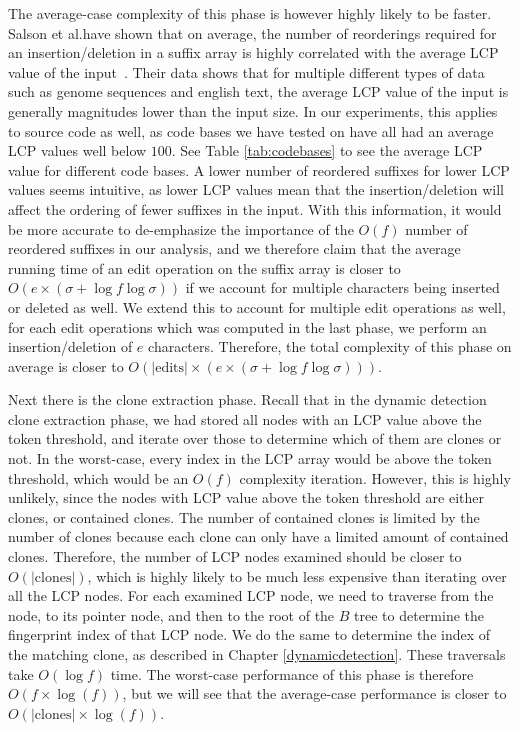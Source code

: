 The average-case complexity of this phase is however highly likely to be faster. Salson et
al.have shown that on average, the number of reorderings required for an
insertion/deletion in a suffix array is highly correlated with the average LCP value of
the input~\cite{DynamicExtendedSuffixArraysReorderings}. Their data shows that for
multiple different types of data such as genome sequences and english text, the average
LCP value of the input is generally magnitudes lower than the input size. In our
experiments, this applies to source code as well, as code bases we have tested on have all
had an average LCP values well below $100$. See Table \ref{tab:codebases} to see the
average LCP value for different code bases. A lower number of reordered suffixes for lower
LCP values seems intuitive, as lower LCP values mean that the insertion/deletion will
affect the ordering of fewer suffixes in the input. With this information, it would be
more accurate to de-emphasize the importance of the $O(f)$ number of reordered suffixes in
our analysis, and we therefore claim that the average running time of an edit operation on
the suffix array is closer to $O(e \times (\sigma + \log f \log\sigma))$ if we account for
multiple characters being inserted or deleted as well. We extend this to account for
multiple edit operations as well, for each edit operations which was computed in the last
phase, we perform an insertion/deletion of $e$ characters. Therefore, the total complexity
of this phase on average is closer to $O(\vert\text{edits}\vert \times (e \times (\sigma +
\log f \log\sigma)))$.

Next there is the clone extraction phase. Recall that in the dynamic detection clone
extraction phase, we had stored all nodes with an LCP value above the token threshold, and
iterate over those to determine which of them are clones or not. In the worst-case, every
index in the LCP array would be above the token threshold, which would be an $O(f)$
complexity iteration. However, this is highly unlikely, since the nodes with LCP value
above the token threshold are either clones, or contained clones. The number of contained
clones is limited by the number of clones because each clone can only have a limited
amount of contained clones. Therefore, the number of LCP nodes examined should be closer
to $O(\vert\text{clones}\vert)$, which is highly likely to be much less expensive than
iterating over all the LCP nodes. For each examined LCP node, we need to traverse from the
node, to its pointer node, and then to the root of the $B$ tree to determine the
fingerprint index of that LCP node. We do the same to determine the index of the matching
clone, as described in Chapter \ref{dynamicdetection}. These traversals take $O(\log f)$ time.
The worst-case performance of this phase is therefore $O(f \times \log(f))$, but we will
see that the average-case performance is closer to $O(\vert\text{clones}\vert \times
\log(f))$.

